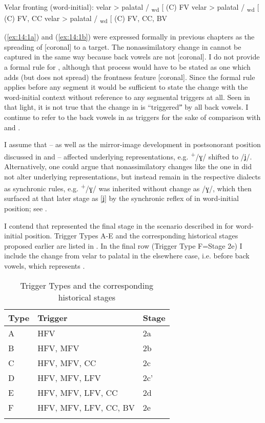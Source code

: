 \ea%
\label{ex:14:1}
Velar fronting (word-initial):
\ex\label{ex:14:1a} velar > palatal / \textsubscript{wd} [ (C) {\longrule}{\longrule} FV
\ex\label{ex:14:1b} velar > palatal / \textsubscript{wd} [ (C) {\longrule}{\longrule} FV, CC
\ex\label{ex:14:1c} velar > palatal / \textsubscript{wd} [ (C) {\longrule}{\longrule} FV, CC, BV
\z 

(\ref{ex:14:1a}) and (\ref{ex:14:1b}) were expressed formally in previous chapters as the spreading of [coronal] to a target. The nonassimilatory change in  cannot be captured in the same way because back vowels are not [coronal]. I do not provide a formal rule for , although that process would have to be stated as one which adds (but does not spread) the frontness feature [coronal]. Since the formal rule applies before any segment it would be sufficient to state the change with the word-initial context without reference to any segmental triggers at all. Seen in that light, it is not true that the change in  is “triggeredˮ by all back vowels. I continue to refer to the back vowels in  as triggers for the sake of comparison with  and .

I assume that  -- as well as the mirror-image development in postsonorant position discussed in  and  -- affected underlying representations, e.g.  \textsuperscript{+}/ɣ/ shifted to /ʝ/. Alternatively, one could argue that nonassimilatory changes like the one in  did not alter underlying representations, but instead remain in the respective dialects as synchronic rules, e.g.  \textsuperscript{+}/ɣ/ was inherited without change as /ɣ/, which then surfaced at that later stage as [ʝ] by the synchronic reflex of  in word-initial position; see .

I contend that  represented the final stage in the  scenario described in  for word-initial position. Trigger Types A-E and the corresponding historical stages proposed earlier are listed in . In the final row (Trigger Type F=Stage 2e) I include the change from velar to palatal in the elsewhere case, i.e. before back vowels, which represents .

\begin{table}
\caption{Trigger Types and the corresponding historical stages\label{tab:14:1}}
\begin{tabular}{lll}
\lsptoprule
Type & Trigger & Stage\\\midrule
A & HFV & 2a\\
B & HFV, MFV & 2b\\
C & HFV, MFV, CC & 2c\\
D & HFV, MFV, LFV & 2c'\\
E & HFV, MFV, LFV, CC & 2d\\
F & HFV, MFV, LFV, CC, BV & 2e\\
\lspbottomrule
\end{tabular}
\end{table}

